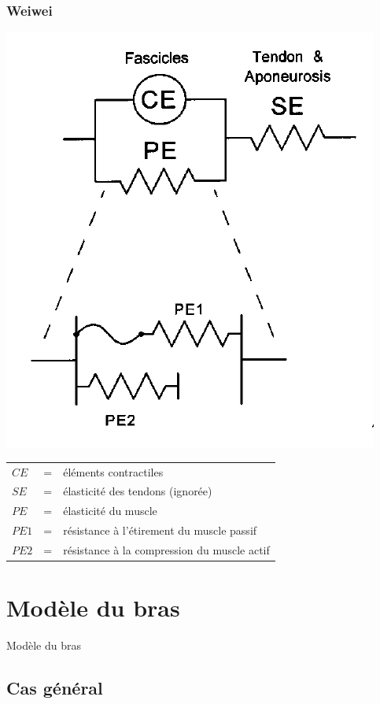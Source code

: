 \documentclass{beamer}
\begin{document}
\begin{frame}
\frametitle{Weiwei}
\begin{center}
        \includegraphics[width=.40\linewidth]{fig/brown}
\end{center}
\begin{tabular}{lcl}
    $CE$  & = & éléments contractiles \\
    $SE$  & = & élasticité des tendons (ignorée) \\
    $PE$  & = & élasticité du muscle \\
    $PE1$ & = & résistance à l'étirement du muscle passif \\
    $PE2$ & = & résistance à la compression du muscle actif \\
\end{tabular}
\end{frame}



\section{Modèle du bras}
\begin{frame}
\begin{center}
{\LARGE Modèle du bras}
\end{center}
\end{frame}


\subsection{Cas général}
\end{document}

